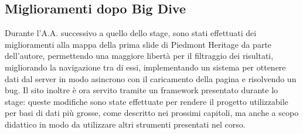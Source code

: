 \subsection{Miglioramenti dopo Big Dive}
Durante l'A.A. successivo a quello dello stage, sono stati effettuati dei miglioramenti alla mappa della prima slide di Piedmont Heritage da parte dell'autore, permettendo una maggiore libertà per il filtraggio dei risultati, migliorando la navigazione tra di essi, implementando un sistema per ottenere dati dal server in modo asincrono con il caricamento della pagina e risolvendo un bug.
Il sito inoltre è ora servito tramite un framework presentato durante lo stage: queste modifiche sono state effettuate per rendere il progetto utilizzabile per basi di dati più grosse, come descritto nei prossimi capitoli, ma anche a scopo didattico in modo da utilizzare altri strumenti presentati nel corso.